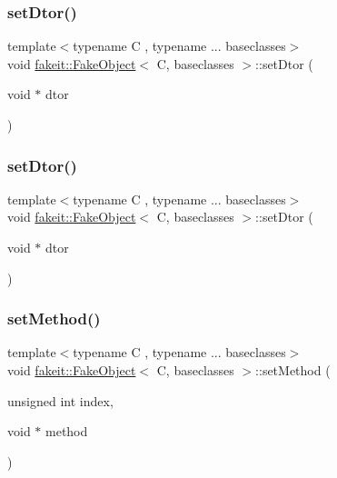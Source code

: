\subsubsection{\texorpdfstring{setDtor()}{setDtor()}\hspace{0.1cm}{\footnotesize\ttfamily [8/9]}}
{\footnotesize\ttfamily template$<$typename C , typename ... baseclasses$>$ \\
void \mbox{\hyperlink{classfakeit_1_1FakeObject}{fakeit\+::\+Fake\+Object}}$<$ C, baseclasses $>$\+::set\+Dtor (\begin{DoxyParamCaption}\item[{void $\ast$}]{dtor }\end{DoxyParamCaption})\hspace{0.3cm}{\ttfamily [inline]}}

\mbox{\label{classfakeit_1_1FakeObject_a8045605042e0351da1e5d81288ae46ec}} 
\subsubsection{\texorpdfstring{setDtor()}{setDtor()}\hspace{0.1cm}{\footnotesize\ttfamily [9/9]}}
{\footnotesize\ttfamily template$<$typename C , typename ... baseclasses$>$ \\
void \mbox{\hyperlink{classfakeit_1_1FakeObject}{fakeit\+::\+Fake\+Object}}$<$ C, baseclasses $>$\+::set\+Dtor (\begin{DoxyParamCaption}\item[{void $\ast$}]{dtor }\end{DoxyParamCaption})\hspace{0.3cm}{\ttfamily [inline]}}

\mbox{\label{classfakeit_1_1FakeObject_ad05ea03dec6dc302d6d7b62e47bd1219}} 
\subsubsection{\texorpdfstring{setMethod()}{setMethod()}\hspace{0.1cm}{\footnotesize\ttfamily [1/9]}}
{\footnotesize\ttfamily template$<$typename C , typename ... baseclasses$>$ \\
void \mbox{\hyperlink{classfakeit_1_1FakeObject}{fakeit\+::\+Fake\+Object}}$<$ C, baseclasses $>$\+::set\+Method (\begin{DoxyParamCaption}\item[{unsigned int}]{index,  }\item[{void $\ast$}]{method }\end{DoxyParamCaption})\hspace{0.3cm}{\ttfamily [inline]}}

